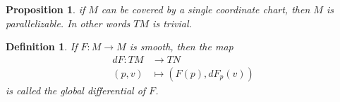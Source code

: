 \documentclass[a4paper]{article}
\newtheorem*{prop}{Proposition}
\newtheorem*{defn}{Definition}
\begin{document}
\begin{prop}
  if $M$ can be covered by a single coordinate chart, then $M$ is parallelizable. In other words $TM$ is trivial.
\end{prop}

\begin{defn}
  If $F: M \rightarrow M$ is smooth, then the map 
  \[
    \begin{aligned}
      dF: TM &\rightarrow TN \\
      (p,v) &\mapsto (F(p), dF_p(v))
    \end{aligned}
  \]
  is called the global differential of $F$.
\end{defn}
\end{document}
